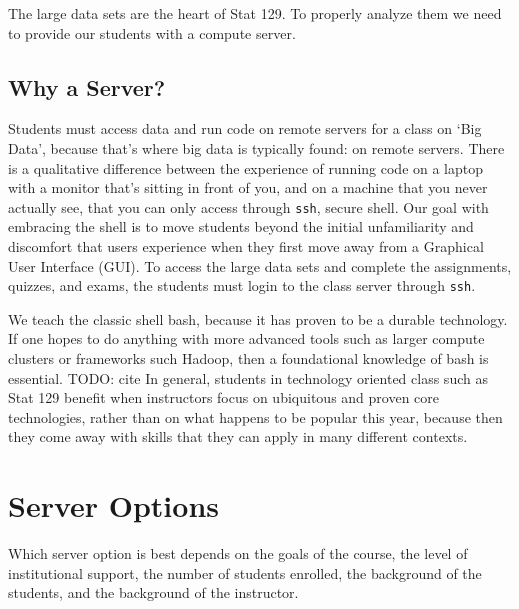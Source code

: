 \documentclass[12pt]{article}
\begin{document}
The large data sets are the heart of Stat 129.
To properly analyze them we need to provide our students with a compute server.


\subsection{Why a Server?}

Students must access data and run code on remote servers for a class on `Big Data', because that's where big data is typically found: on remote servers.
There is a qualitative difference between the experience of running code on a laptop with a monitor that's sitting in front of you, and on a machine that you never actually see, that you can only access through \texttt{ssh}, secure shell.
Our goal with embracing the shell is to move students beyond the initial unfamiliarity and discomfort that users experience when they first move away from a Graphical User Interface (GUI).
To access the large data sets and complete the assignments, quizzes, and exams, the students must login to the class server through \texttt{ssh}.

We teach the classic shell bash, because it has proven to be a durable technology.
If one hopes to do anything with more advanced tools such as larger compute clusters or frameworks such Hadoop, then a foundational knowledge of bash is essential.
TODO: cite
In general, students in technology oriented class such as Stat 129 benefit when instructors focus on ubiquitous and proven core technologies, rather than on what happens to be popular this year, because then they come away with skills that they can apply in many different contexts.


\section{Server Options}


Which server option is best depends on the goals of the course, the level of institutional support, the number of students enrolled, the background of the students, and the background of the instructor.

\end{document}
